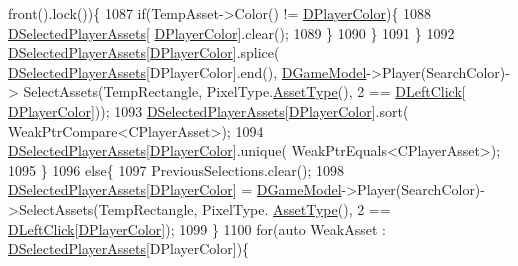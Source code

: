 \begin{DoxyCode}
      front().lock())\{
1087                                 \textcolor{keywordflow}{if}(TempAsset->Color() != \hyperlink{classCApplicationData_a53550939b20cba70570f113e4d1c5d02}{DPlayerColor})\{
1088                                     \hyperlink{classCApplicationData_a05c1087d5a5c4ddc14fcb37444f1642b}{DSelectedPlayerAssets}[
      \hyperlink{classCApplicationData_a53550939b20cba70570f113e4d1c5d02}{DPlayerColor}].clear();
1089                                 \}
1090                             \}
1091                         \}
1092                         \hyperlink{classCApplicationData_a05c1087d5a5c4ddc14fcb37444f1642b}{DSelectedPlayerAssets}[\hyperlink{classCApplicationData_a53550939b20cba70570f113e4d1c5d02}{DPlayerColor}].splice(
      \hyperlink{classCApplicationData_a05c1087d5a5c4ddc14fcb37444f1642b}{DSelectedPlayerAssets}[DPlayerColor].end(), \hyperlink{classCApplicationData_a32b50c7c1cbac3cfd67c7f775b1d6fee}{DGameModel}->Player(SearchColor)->
      SelectAssets(TempRectangle, PixelType.\hyperlink{classCPixelType_addcf6c6d11e8ebafe4455beaa995b675}{AssetType}(), 2 == \hyperlink{classCApplicationData_a8a86bb4c7cba7b119121401dda4ca68b}{DLeftClick}[
      \hyperlink{classCApplicationData_a53550939b20cba70570f113e4d1c5d02}{DPlayerColor}]));
1093                         \hyperlink{classCApplicationData_a05c1087d5a5c4ddc14fcb37444f1642b}{DSelectedPlayerAssets}[\hyperlink{classCApplicationData_a53550939b20cba70570f113e4d1c5d02}{DPlayerColor}].sort(
      WeakPtrCompare<CPlayerAsset>);
1094                         \hyperlink{classCApplicationData_a05c1087d5a5c4ddc14fcb37444f1642b}{DSelectedPlayerAssets}[\hyperlink{classCApplicationData_a53550939b20cba70570f113e4d1c5d02}{DPlayerColor}].unique(
      WeakPtrEquals<CPlayerAsset>);
1095                     \}
1096                     \textcolor{keywordflow}{else}\{
1097                         PreviousSelections.clear();
1098                         \hyperlink{classCApplicationData_a05c1087d5a5c4ddc14fcb37444f1642b}{DSelectedPlayerAssets}[\hyperlink{classCApplicationData_a53550939b20cba70570f113e4d1c5d02}{DPlayerColor}] = 
      \hyperlink{classCApplicationData_a32b50c7c1cbac3cfd67c7f775b1d6fee}{DGameModel}->Player(SearchColor)->SelectAssets(TempRectangle, PixelType.
      \hyperlink{classCPixelType_addcf6c6d11e8ebafe4455beaa995b675}{AssetType}(), 2 == \hyperlink{classCApplicationData_a8a86bb4c7cba7b119121401dda4ca68b}{DLeftClick}[\hyperlink{classCApplicationData_a53550939b20cba70570f113e4d1c5d02}{DPlayerColor}]);
1099                     \}
1100                     \textcolor{keywordflow}{for}(\textcolor{keyword}{auto} WeakAsset : \hyperlink{classCApplicationData_a05c1087d5a5c4ddc14fcb37444f1642b}{DSelectedPlayerAssets}[DPlayerColor])\{

\end{DoxyCode}
